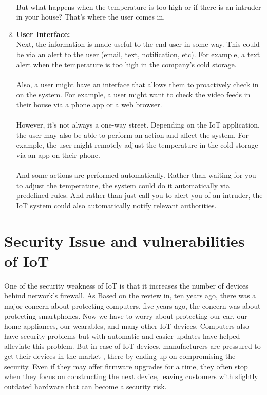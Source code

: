 \begin{enumerate}
\paragraph{}But what happens when the temperature is too high or if there is an intruder in your house? That’s where the user comes in.
\item \textbf{User Interface:}\\
Next, the information is made useful to the end-user in some way. This could be via an alert to the user (email, text, notification, etc). For example, a text alert when the temperature is too high in the company’s cold storage.
\paragraph{}Also, a user might have an interface that allows them to proactively check in on the system. For example, a user might want to check the video feeds in their house via a phone app or a web browser.
\paragraph{}However, it’s not always a one-way street. Depending on the IoT application, the user may also be able to perform an action and affect the system. For example, the user might remotely adjust the temperature in the cold storage via an app on their phone.
\paragraph{}And some actions are performed automatically. Rather than waiting for you to adjust the temperature, the system could do it automatically via predefined rules. And rather than just call you to alert you of an intruder, the IoT system could also automatically notify relevant authorities.
\end{enumerate}

\section{Security Issue and vulnerabilities of IoT}
One of the security weakness of IoT is that it increases
the number of devices behind network’s firewall. As
Based on the review in, ten years ago, there was a
major concern about protecting computers, five years
ago, the concern was about protecting smartphones.
Now we have to worry about protecting our car, our
home appliances, our wearables, and many other IoT
devices. Computers also have security problems but
with automatic and easier updates have helped alleviate
this problem. But in case of IoT devices, manufacturers
are pressured to get their devices in the market , there
by ending up on compromising the security. Even if
they may offer firmware upgrades for a time, they often
stop when they focus on constructing the next device,
leaving customers with slightly outdated hardware that
can become a security risk.
